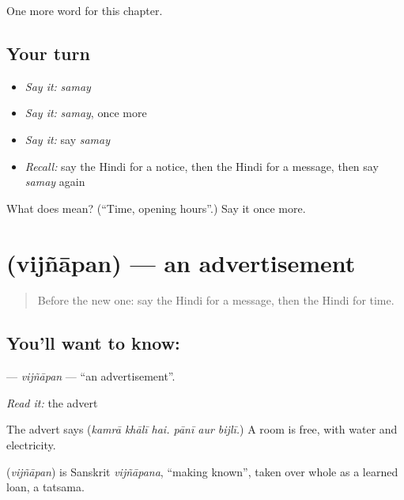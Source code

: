 \begin{grammarlens}[title={What you've built}]
One more word for this chapter.
\end{grammarlens}

\subsection*{Your turn}
\begin{itemize}
\raggedright
  \item \emph{Say it:} \emph{samay}
  \item \emph{Say it:} \emph{samay}, once more
  \item \emph{Say it:} say \emph{samay}
  \item \emph{Recall:} say the Hindi for a notice, then the Hindi for a message, then say \emph{samay} again
\end{itemize}

\begin{tcolorbox}[breakable,colback=teal!4,colframe=teal!35!black,title={Before you move on}]
What does  mean? (\textquotedblleft{}Time, opening hours\textquotedblright{}.) Say it once more.
\end{tcolorbox}
\section[\texorpdfstring{\hi{विज्ञापन} (vijñāpan)}{विज्ञापन (vijñāpan)}]{ (vijñāpan) — an advertisement}

\label{lesson:HI-C166-vijnapan}



\begin{quote}
Before the new one: say the Hindi for a message, then the Hindi for time.
\end{quote}

\subsection*{You'll want to know: }
\textbf{} — \emph{vijñāpan} — \textquotedblleft{}an advertisement\textquotedblright{}.

\emph{Read it:} the advert

The advert says \textbf{     } (\emph{kamrā khālī hai. pānī aur bijlī.}) A room is free, with water and electricity.

\begin{cousinweb}
\textbf{} (\emph{vijñāpan}) is Sanskrit \emph{vijñāpana}, \textquotedblleft{}making known\textquotedblright{}, taken over whole as a learned loan, a tatsama.
\end{cousinweb}

